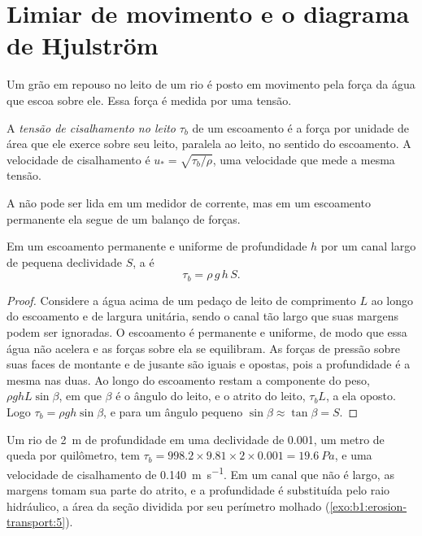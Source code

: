 \section{Limiar de movimento e o diagrama de Hjulström}\label{sec:b1:erosion-transport:threshold}

Um grão em repouso no leito de um rio é posto em movimento pela força da água que escoa sobre ele. Essa força é medida por uma tensão.

\begin{definition}\label{def:b1:erosion-transport:bed-shear}
A \emph{tensão de cisalhamento no leito} $\tau_b$ de um escoamento é a força por unidade de área que ele exerce sobre seu leito, paralela ao leito, no sentido do escoamento. A velocidade de cisalhamento é $u_* = \sqrt{\tau_b/\rho}$, uma velocidade que mede a mesma tensão.
\end{definition}

A  não pode ser lida em um medidor de corrente, mas em um escoamento permanente ela segue de um balanço de forças.

\begin{proposition}\label{prop:b1:erosion-transport:depth-slope}
Em um escoamento permanente e uniforme de profundidade $h$ por um canal largo de pequena declividade $S$, a  é
\[
  \tau_b = \rho\,g\,h\,S .
\]
\end{proposition}

\begin{proof}
Considere a água acima de um pedaço de leito de comprimento $L$ ao longo do escoamento e de largura unitária, sendo o canal tão largo que suas margens podem ser ignoradas. O escoamento é permanente e uniforme, de modo que essa água não acelera e as forças sobre ela se equilibram. As forças de pressão sobre suas faces de montante e de jusante são iguais e opostas, pois a profundidade é a mesma nas duas. Ao longo do escoamento restam a componente do peso, $\rho g h L \sin\beta$, em que $\beta$ é o ângulo do leito, e o atrito do leito, $\tau_b L$, a ela oposto. Logo $\tau_b
= \rho g h \sin\beta$, e para um ângulo pequeno $\sin\beta \approx \tan\beta = S$.
\end{proof}

Um rio de \qty{2}{m} de profundidade em uma declividade de \num{0.001}, um metro de queda por quilômetro, tem $\tau_b = 998.2 \times 9.81 \times 2 \times 0.001 =
\qty{19.6}{Pa}$, e uma velocidade de cisalhamento de \qty{0.140}{m.s^{-1}}. Em um canal que não é largo, as margens tomam sua parte do atrito, e a profundidade é substituída pelo raio hidráulico, a área da seção dividida por seu perímetro molhado (\cref{exo:b1:erosion-transport:5}).

